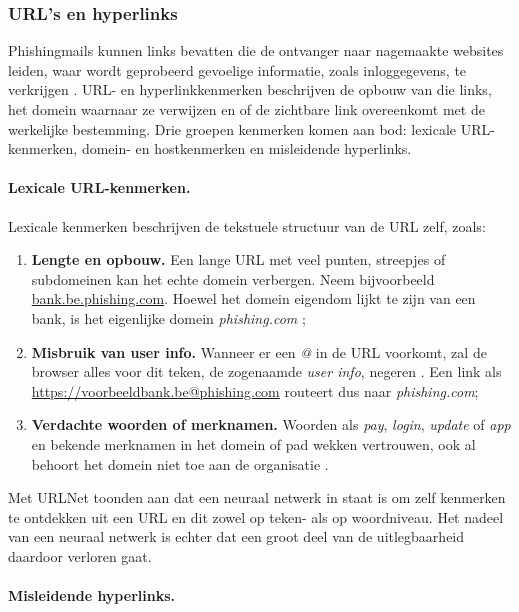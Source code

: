 \subsubsection{URL's en hyperlinks}%
\label{subsubsec:urls-hyperlinks}

Phishingmails kunnen links bevatten die de ontvanger naar nagemaakte websites leiden, waar wordt geprobeerd gevoelige informatie, zoals inloggegevens, te verkrijgen \autocite{Varshney2016}. 
URL- en hyperlinkkenmerken beschrijven de opbouw van die links, het domein waarnaar ze verwijzen en of de zichtbare link overeenkomt met de werkelijke bestemming. Drie groepen kenmerken komen aan bod: lexicale URL-kenmerken, domein- en hostkenmerken en misleidende hyperlinks.

\paragraph{Lexicale URL-kenmerken.}
Lexicale kenmerken beschrijven de tekstuele structuur van de URL zelf, zoals:
\begin{enumerate}
    \item \textbf{Lengte en opbouw.} Een lange URL met veel punten, streepjes of subdomeinen kan het echte domein verbergen. Neem bijvoorbeeld \url{bank.be.phishing.com}. Hoewel het domein eigendom lijkt te zijn van een bank, is het eigenlijke domein \emph{phishing.com} \autocite{Ma2009};
    \item \textbf{Misbruik van user info.} Wanneer er een \emph{@} in de URL voorkomt, zal de browser alles voor dit teken, de zogenaamde \emph{user info}, negeren \autocite{Berners2005}. Een link als \url{https://voorbeeldbank.be@phishing.com} routeert dus naar \emph{phishing.com};
    \item \textbf{Verdachte woorden of merknamen.} Woorden als \emph{pay}, \emph{login}, \emph{update} of \emph{app} en bekende merknamen in het domein of pad wekken vertrouwen, ook al behoort het domein niet toe aan de organisatie \autocite{Tupsamudre2021}.
\end{enumerate}

Met URLNet toonden \textcite{Le2018} aan dat een neuraal netwerk in staat is om zelf kenmerken te ontdekken uit een URL en dit zowel op teken- als op woordniveau. Het nadeel van een neuraal netwerk is echter dat een groot deel van de uitlegbaarheid daardoor verloren gaat.

\paragraph{Misleidende hyperlinks.}
\label{subsubsec:urls-hyperlinks::misleidende-hyperlinks}

